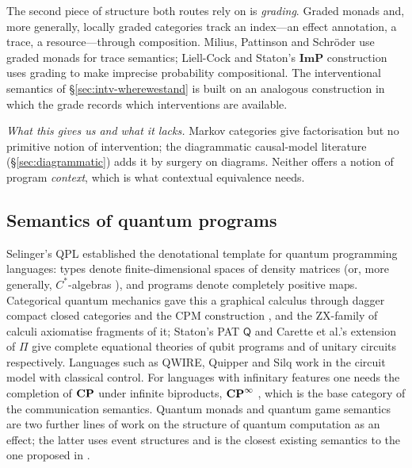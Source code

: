 The second piece of structure both routes rely on is \emph{grading}. Graded monads \cite{katsumata2014_graded_strong_monad,orchard2020unifying,fujii2016towards,dorsch2019graded} and, more generally, locally graded categories \cite{levy2019locallygraded,sarkis2025string} track an index---an effect annotation, a trace, a resource---through composition. Milius, Pattinson and Schröder \cite{milius2015gradedtrace} use graded monads for trace semantics; Liell-Cock and Staton's $\mathbf{ImP}$ construction \cite{liell2025compositional} uses grading to make imprecise probability compositional. The interventional semantics of \S\ref{sec:intv-wherewestand} is built on an analogous construction in which the grade records which interventions are available.

\emph{What this gives us and what it lacks.} Markov categories give factorisation but no primitive notion of intervention; the diagrammatic causal-model literature (\S\ref{sec:diagrammatic}) adds it by surgery on diagrams. Neither offers a notion of program \emph{context}, which is what contextual equivalence needs.

\subsection{Semantics of quantum programs}

Selinger's QPL \cite{QPL_SELINGER_2004} established the denotational template for quantum programming languages: types denote finite-dimensional spaces of density matrices (or, more generally, $C^*$-algebras \cite{SemOperatorAlgebra}), and programs denote completely positive maps. Categorical quantum mechanics \cite{abramsky2007categoricalsemanticsquantumprotocols,heunen_vicary_book,PQP_Coecke_Kissinger_2017} gave this a graphical calculus through dagger compact closed categories and the CPM construction \cite{selinger_dagger_compact_closed_cat_cp_maps}, and the ZX-family of calculi axiomatise fragments of it; Staton's PAT $\mathsf{Q}$ \cite{statonpopl15} and Carette et al.'s extension of $\Pi$ \cite{Quantum_PI_Carette_2024} give complete equational theories of qubit programs and of unitary circuits respectively. Languages such as QWIRE, Quipper and Silq \cite{qwire_10.1145/3009837.3009894,quipper_DBLP:journals/corr/abs-1304-3390,silq} work in the circuit model with classical control. For languages with infinitary features one needs the completion of $\mathbf{CP}$ under infinite biproducts, $\mathbf{CP}^{\infty}$ \cite{PaganiSV13,D_Completion_ZHAO20102167}, which is the base category of the communication semantics. Quantum monads \cite{sati2023quantummonadology,QIO_Altenkirch_Green_2009} and quantum game semantics \cite{clairambault2019quantumgames} are two further lines of work on the structure of quantum computation as an effect; the latter uses event structures and is the closest existing semantics to the one proposed in .


